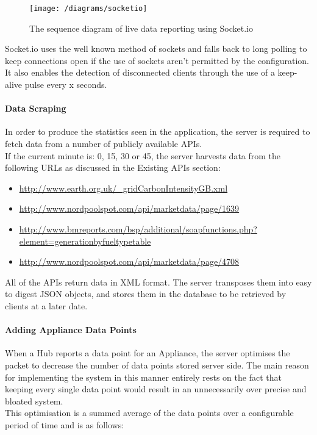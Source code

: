 \documentclass[draft,preprint,12pt,3p]{elsarticle}
\begin{document}
\begin{figure}[H]
    \centering
    \texttt{[image: /diagrams/socketio]}
    \caption {The sequence diagram of live data reporting using Socket.io}
\end{figure}

Socket.io uses the well known method of sockets and falls back to long polling to keep connections open if the use of sockets aren't permitted by the configuration. It also enables the detection of disconnected clients through the use of a keep-alive pulse every x seconds.

\paragraph{Data Scraping}

In order to produce the statistics seen in the application, the server is required to fetch data from a number of publicly available APIs.\\
If the current minute is: 0, 15, 30 or  45, the server harvests data from the following URLs as discussed in the Existing APIs section:
\begin{itemize}
\item \url{http://www.earth.org.uk/_gridCarbonIntensityGB.xml}

\item \url{http://www.nordpoolspot.com/api/marketdata/page/1639}

\item \url{http://www.bmreports.com/bsp/additional/soapfunctions.php?element=generationbyfueltypetable}

\item \url{http://www.nordpoolspot.com/api/marketdata/page/4708}
\end{itemize}
All of the APIs return data in XML format. The server transposes them into easy to digest JSON objects, and stores them in the database to be retrieved by clients at a later date.\\

\paragraph{Adding Appliance Data Points}
When a Hub reports a data point for an Appliance, the server optimises the packet to decrease the number of data points stored server side. The main reason for implementing the system in this manner entirely rests on the fact that keeping every single data point would result in an unnecessarily over precise and bloated system.\\
This optimisation is a summed average of the data points over a configurable period of time and is as follows:
\end{document}
